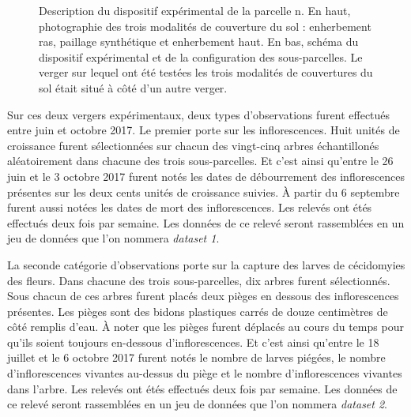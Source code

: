 \begin{figure}[ht]
 \caption{Description du dispositif expérimental de la parcelle n. 
 En haut, photographie des trois modalités de couverture du sol : enherbement ras, paillage synthétique et enherbement haut.
 En bas, schéma du dispositif expérimental et de la configuration des sous-parcelles.  Le verger sur lequel ont été testées les trois modalités de couvertures du sol était situé à côté d'un autre verger.}
 \label{fig:exp}
\end{figure}

Sur ces deux vergers expérimentaux, deux types d'observations furent effectués entre juin et octobre 2017. 
Le premier porte sur les inflorescences. 
Huit unités de croissance furent sélectionnées sur chacun des vingt-cinq arbres échantillonés aléatoirement dans chacune des trois sous-parcelles.
Et c'est ainsi qu'entre le 26 juin et le 3 octobre 2017 furent notés les dates de débourrement des inflorescences présentes sur les deux cents unités de croissance suivies.
À partir du 6 septembre furent aussi notées les dates de mort des inflorescences.
Les relevés ont étés effectués deux fois par semaine.
Les données de ce relevé seront rassemblées en un jeu de données que l'on nommera \emph{dataset 1}.

La seconde catégorie d'observations porte sur la capture des larves de cécidomyies des fleurs.
Dans chacune des trois sous-parcelles, dix arbres furent sélectionnés. 
Sous chacun de ces arbres furent placés deux pièges en dessous des inflorescences présentes.
Les pièges sont des bidons plastiques carrés de douze centimètres de côté remplis d'eau.
À noter que les pièges furent déplacés au cours du temps pour qu'ils soient toujours en-dessous d'inflorescences.
Et c'est ainsi qu'entre le 18 juillet et le 6 octobre 2017 furent notés le nombre de larves piégées, le nombre d'inflorescences vivantes au-dessus du piège et le nombre d'inflorescences vivantes dans l'arbre.
Les relevés ont étés effectués deux fois par semaine.
Les données de ce relevé seront rassemblées en un jeu de données que l'on nommera \emph{dataset 2}.

